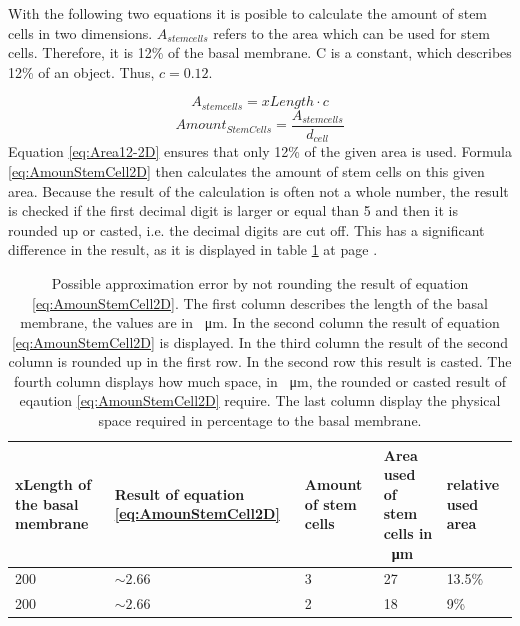 With the following two equations it is posible to calculate the amount of stem cells in two dimensions. $A_{stem cells}$ refers to the area which can be used for stem cells. Therefore, it is 12\% of the basal membrane. C is a constant, which describes 12\% of an object. Thus, $c=0.12$.

\begin{equation}\label{eq:Area12-2D}
A_{stem cells} = xLength \cdot c
\end{equation}
\begin{equation}\label{eq:AmounStemCell2D}
Amount_{StemCells} = \dfrac{A_{stem cells}}{d_{cell}} 
\end{equation}
Equation \ref{eq:Area12-2D} ensures that only 12\% of the given area is used. Formula \ref{eq:AmounStemCell2D} then calculates the amount of stem cells on this given area. Because the result of the calculation is often not a whole number, the result is checked if the first decimal digit is larger or equal than 5 and then it is rounded up or casted, i.e. the decimal digits are cut off. This has a significant difference in the result, as it is displayed in table \ref{tbl:Approximation error} at page \pageref{tbl:Approximation error}.

\begin{table}
\centering
\caption{Possible approximation error by not rounding the result of equation \ref{eq:AmounStemCell2D}. The first column describes the length of the basal membrane, the values are  in \SI{}{\micro\metre}. In the second column the result of equation \ref{eq:AmounStemCell2D} is displayed. In the third column the result of the second column is rounded up in the first row. In the second row this result is casted. The fourth column displays how much space, in \SI{}{\micro\metre}, the rounded or casted result of eqaution \ref{eq:AmounStemCell2D} require. The last column display the physical space required in percentage to the basal membrane.}
\renewcommand{\arraystretch}{1.5}
	\begin{tabularx}{\textwidth}{X||X||X||X||X}
		xLength of the basal membrane & Result of equation \ref{eq:AmounStemCell2D} & Amount of stem cells & Area used of stem cells  in \SI{}{\micro\metre} & relative used area  \\
		\hline
		200 & $\sim 2.66$ & 3 & 27 & 13.5\% \\
		
		200 & $\sim 2.66$ & 2 & 18 & 9\% 

	\end{tabularx}
	\label{tbl:Approximation error}
\end{table}

